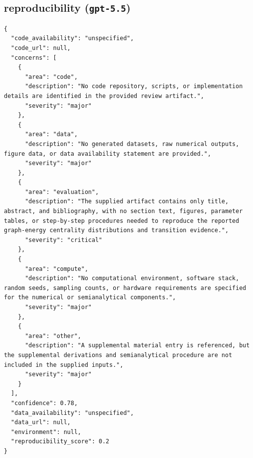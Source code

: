 \documentclass[11pt]{article}
\begin{document}
\subsection*{reproducibility (\texttt{gpt-5.5})}
\begin{verbatim}
{
  "code_availability": "unspecified",
  "code_url": null,
  "concerns": [
    {
      "area": "code",
      "description": "No code repository, scripts, or implementation details are identified in the provided review artifact.",
      "severity": "major"
    },
    {
      "area": "data",
      "description": "No generated datasets, raw numerical outputs, figure data, or data availability statement are provided.",
      "severity": "major"
    },
    {
      "area": "evaluation",
      "description": "The supplied artifact contains only title, abstract, and bibliography, with no section text, figures, parameter tables, or step-by-step procedures needed to reproduce the reported graph-energy centrality distributions and transition evidence.",
      "severity": "critical"
    },
    {
      "area": "compute",
      "description": "No computational environment, software stack, random seeds, sampling counts, or hardware requirements are specified for the numerical or semianalytical components.",
      "severity": "major"
    },
    {
      "area": "other",
      "description": "A supplemental material entry is referenced, but the supplemental derivations and semianalytical procedure are not included in the supplied inputs.",
      "severity": "major"
    }
  ],
  "confidence": 0.78,
  "data_availability": "unspecified",
  "data_url": null,
  "environment": null,
  "reproducibility_score": 0.2
}
\end{verbatim}
\end{document}
